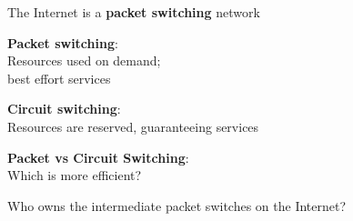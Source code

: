 \begin{frame}\begin{center}\large
The Internet is a \textbf{packet switching} network
\end{center}\end{frame}

\begin{frame}\begin{center}\large
\textbf{Packet switching}:\\\large Resources used on demand;\\best effort services
\end{center}\end{frame}

\begin{frame}\begin{center}\large
\textbf{Circuit switching}:\\\large Resources are reserved, guaranteeing services
\end{center}\end{frame}

\begin{frame}\begin{center}\large
\textbf{Packet vs Circuit Switching}:\\\large Which is more efficient?
\end{center}\end{frame}

\begin{frame} \begin{center}\large
Who owns the intermediate packet switches on the Internet?
\end{center}\end{frame}

